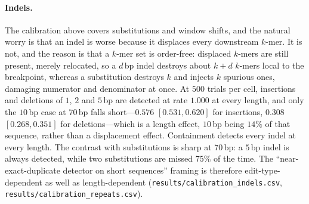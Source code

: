 \documentclass[11pt,a4paper]{article}
\begin{document}
\paragraph{Indels.} The calibration above covers substitutions and window shifts, and the natural
worry is that an indel is worse because it displaces every downstream $k$-mer. It is not, and the
reason is that a $k$-mer set is order-free: displaced $k$-mers are still present, merely relocated,
so a $d$\,bp indel destroys about $k+d$ $k$-mers local to the breakpoint, whereas a substitution
destroys $k$ and injects $k$ spurious ones, damaging numerator and denominator at once. At $500$
trials per cell, insertions and deletions of $1$, $2$ and $5$\,bp are detected at rate $1.000$ at
every length, and only the $10$\,bp case at $70$\,bp falls short---$0.576$ $[0.531,0.620]$ for
insertions, $0.308$ $[0.268,0.351]$ for deletions---which is a length effect, $10$\,bp being $14\%$
of that sequence, rather than a displacement effect. Containment detects every indel at every length.
The contrast with substitutions is sharp at $70$\,bp: a $5$\,bp indel is always detected, while two
substitutions are missed $75\%$ of the time. The ``near-exact-duplicate detector on short sequences''
framing is therefore edit-type-dependent as well as length-dependent
(\texttt{results/calibration\_indels.csv}, \texttt{results/calibration\_repeats.csv}).
\end{document}
